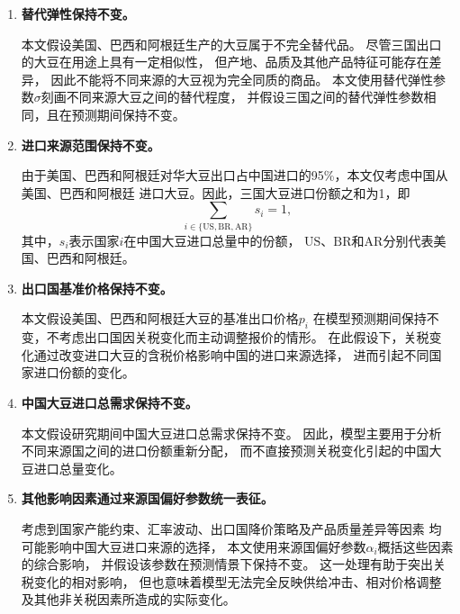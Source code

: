\documentclass{apmcmthesis}
\begin{document}
\begin{enumerate}[label=\arabic*., leftmargin=2.5em]

    \item \textbf{替代弹性保持不变。}

    本文假设美国、巴西和阿根廷生产的大豆属于不完全替代品。
    尽管三国出口的大豆在用途上具有一定相似性，
    但产地、品质及其他产品特征可能存在差异，
    因此不能将不同来源的大豆视为完全同质的商品。
    本文使用替代弹性参数$\sigma$刻画不同来源大豆之间的替代程度，
    并假设三国之间的替代弹性参数相同，且在预测期间保持不变。

    \item \textbf{进口来源范围保持不变。}

    由于美国、巴西和阿根廷对华大豆出口占中国进口的95\%，本文仅考虑中国从美国、巴西和阿根廷
    进口大豆。因此，三国大豆进口份额之和为1，即
    \begin{equation}
        \sum_{i\in\{\mathrm{US},\mathrm{BR},\mathrm{AR}\}}s_i=1,
        \label{eq:share_sum}
    \end{equation}
    其中，$s_i$表示国家$i$在中国大豆进口总量中的份额，
    $\mathrm{US}$、$\mathrm{BR}$和$\mathrm{AR}$分别代表美国、巴西和阿根廷。

    \item \textbf{出口国基准价格保持不变。}

    本文假设美国、巴西和阿根廷大豆的基准出口价格$p_i$
    在模型预测期间保持不变，不考虑出口国因关税变化而主动调整报价的情形。
    在此假设下，关税变化通过改变进口大豆的含税价格影响中国的进口来源选择，
    进而引起不同国家进口份额的变化。

    \item \textbf{中国大豆进口总需求保持不变。}

    本文假设研究期间中国大豆进口总需求保持不变。
    因此，模型主要用于分析不同来源国之间的进口份额重新分配，
    而不直接预测关税变化引起的中国大豆进口总量变化。

    \item \textbf{其他影响因素通过来源国偏好参数统一表征。}

    考虑到国家产能约束、汇率波动、出口国降价策略及产品质量差异等因素
    均可能影响中国大豆进口来源的选择，
    本文使用来源国偏好参数$\alpha_i$概括这些因素的综合影响，
    并假设该参数在预测情景下保持不变。
    这一处理有助于突出关税变化的相对影响，
    但也意味着模型无法完全反映供给冲击、相对价格调整
    及其他非关税因素所造成的实际变化。

\end{enumerate}
\end{document}
